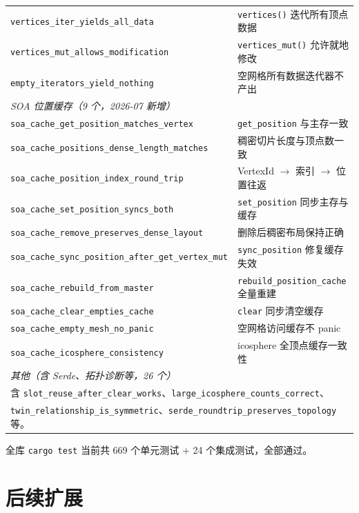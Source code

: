 \documentclass[11pt,a4paper]{article}
\begin{document}
\begin{center}
\begin{tabular}{@{}ll@{}}
  \texttt{vertices\_iter\_yields\_all\_data} & \texttt{vertices()} 迭代所有顶点数据 \\
  \texttt{vertices\_mut\_allows\_modification} & \texttt{vertices\_mut()} 允许就地修改 \\
  \texttt{empty\_iterators\_yield\_nothing} & 空网格所有数据迭代器不产出 \\
  \midrule
  \multicolumn{2}{l}{\textit{SOA 位置缓存（9 个，2026-07 新增）}} \\
  \texttt{soa\_cache\_get\_position\_matches\_vertex} & \texttt{get\_position} 与主存一致 \\
  \texttt{soa\_cache\_positions\_dense\_length\_matches} & 稠密切片长度与顶点数一致 \\
  \texttt{soa\_cache\_position\_index\_round\_trip} & VertexId $\to$ 索引 $\to$ 位置往返 \\
  \texttt{soa\_cache\_set\_position\_syncs\_both} & \texttt{set\_position} 同步主存与缓存 \\
  \texttt{soa\_cache\_remove\_preserves\_dense\_layout} & 删除后稠密布局保持正确 \\
  \texttt{soa\_cache\_sync\_position\_after\_get\_vertex\_mut} & \texttt{sync\_position} 修复缓存失效 \\
  \texttt{soa\_cache\_rebuild\_from\_master} & \texttt{rebuild\_position\_cache} 全量重建 \\
  \texttt{soa\_cache\_clear\_empties\_cache} & \texttt{clear} 同步清空缓存 \\
  \texttt{soa\_cache\_empty\_mesh\_no\_panic} & 空网格访问缓存不 panic \\
  \texttt{soa\_cache\_icosphere\_consistency} & icosphere 全顶点缓存一致性 \\
  \midrule
  \multicolumn{2}{l}{\textit{其他（含 Serde、拓扑诊断等，26 个）}} \\
  \multicolumn{2}{l}{含 \texttt{slot\_reuse\_after\_clear\_works}、\texttt{large\_icosphere\_counts\_correct}、} \\
  \multicolumn{2}{l}{\texttt{twin\_relationship\_is\_symmetric}、\texttt{serde\_roundtrip\_preserves\_topology} 等。} \\
  \bottomrule
\end{tabular}
\end{center}

全库 \texttt{cargo test} 当前共 669 个单元测试 + 24 个集成测试，全部通过。

\section{后续扩展}
\end{document}
